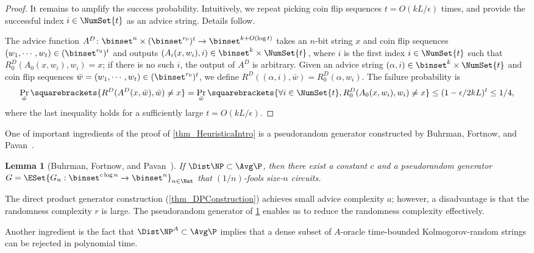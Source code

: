\documentclass[11pt]{article}
\numberwithin{equation}{section}
\newtheorem{lemma}[theorem]{Lemma}
\theoremstyle{definition}
\theoremstyle{plain}
\begin{document}
\begin{proof}
  It remains to amplify the success probability.
  Intuitively,
  we repeat picking coin flip sequences $t = O(k L / \epsilon)$ times,
  and provide the successful index $i \in \NumSet{t}$ as an advice string.
  Details follow.

  The advice function $A^D \colon \binset^n \times (\binset^{r_0})^t \to \binset^{k + O(\log t)}$
  takes an $n$-bit string $x$ and coin flip sequences $(w_1, \cdots, w_t) \in (\binset^{r_0})^t$
  and outputs
  $(A_i(x, w_i), i) \in \binset^k \times \NumSet{t}$,
  where $i$ is the first index $i \in \NumSet{t}$ such that $R_0^D(A_0(x, w_i), w_i) = x$;
  if there is no such $i$, the output of $A^D$ is arbitrary.
  Given an advice string $(\alpha, i) \in \binset^k \times \NumSet{t}$
  and coin flip sequences $\bar{w} = (w_1, \cdots, w_t) \in (\binset^{r_0})^t$,
  we define $R^D((\alpha, i), \bar{w}) = R_0^D(\alpha, w_i)$.
  The failure probability is
  $$
    \Pr_{\bar{w}} \squarebrackets{
      R^D(A^D(x, \bar{w}), \bar{w}) \neq x
    }
    =
    \Pr_{\bar{w}} \squarebrackets{
      \forall i \in \NumSet{t},
      R_0^D(A_0(x, w_i), w_i) \neq x
    }
    \le (1 - \epsilon / 2 k L)^t \le 1 / 4,
  $$
  where the last inequality holds for a sufficiently large $t =O(k L / \epsilon)$.
\end{proof}

%
%
%
%
%
%
%
%
%
%

One of important ingredients of the proof of \cref{thm_HeuristicaIntro} is
a pseudorandom generator constructed by
Buhrman, Fortnow, and Pavan~\cite{BuhrmanFP05_mst_journals}.
\begin{lemma}
  [Buhrman, Fortnow, and Pavan~\cite{BuhrmanFP05_mst_journals}]
  \label{lemma_BFP05}
  If $\Dist\NP \subset \Avg\P$,
  then there exist a constant $c$ and a pseudorandom generator
  $G = \ESet{G_n : \binset^{c \log n} \to \binset^n }_{n \in \Nat}$
  that $(1/n)$-fools size-$n$ circuits.
\end{lemma}

The direct product generator construction (\cref{thm_DPConstruction})
achieves small advice complexity $a$; however,
a disadvantage is that
the randomness complexity $r$ is large.
The pseudorandom generator of \cref{lemma_BFP05} enables us to reduce the randomness complexity effectively.

Another ingredient is the fact that
$\Dist\NP^A \subset \Avg\P$
implies that
a dense subset of $A$-oracle time-bounded Kolmogorov-random strings
can be rejected
in polynomial time.
%
\end{document}

